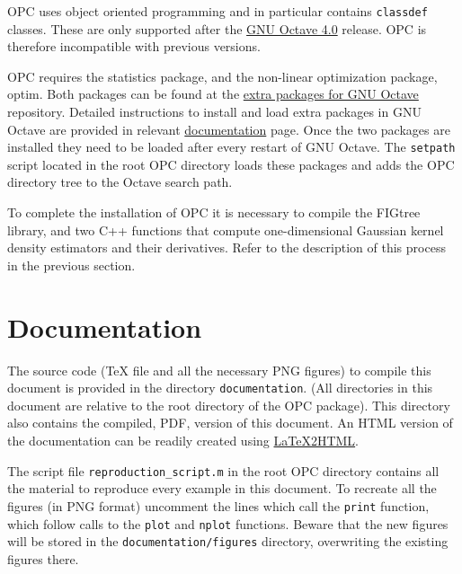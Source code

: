 \documentclass{book}
\begin{document}
OPC uses object oriented programming and in particular contains {\tt classdef}
classes. These are only supported after the
%
\href{https://octave.org/doc/v4.2.2/classdef-Classes.html#classdef-Classes}
{GNU Octave 4.0}
%
release. OPC is therefore incompatible with previous versions.


OPC requires the statistics package, and the non-linear optimization package,
optim. 
%
Both packages can be found at the
\href{https://octave.sourceforge.io/packages.php}{extra packages for GNU
Octave} repository.
%
Detailed instructions to install and load extra packages in GNU Octave are
provided in relevant
\href{https://octave.org/doc/interpreter/Packages.html#Packages}{documentation}
page.
%
Once the two packages are installed they need to be loaded after every restart
of GNU Octave. The {\tt setpath} script located in the root OPC directory loads
these packages and adds the OPC directory tree to the Octave search path.

To complete the installation of OPC it is necessary to compile the FIGtree
library, and two C++ functions that compute one-dimensional Gaussian kernel
density estimators and their derivatives. Refer to the description of this
process in the previous section.



\section{Documentation}


The source code ({\TeX} file and all the necessary PNG figures) to compile this document is
provided in the directory {\tt documentation}. (All directories in this
document are relative to the root directory of the OPC package). This
directory also contains the compiled, PDF, version of this document.
%
An HTML version of the documentation can be readily created using
\href{http://www.latex2html.org/}{LaTeX2HTML}.
%
%



The script file {\tt reproduction\_script.m} in the root OPC directory
contains all the material to reproduce every example in this
document. To recreate all the figures (in PNG format) uncomment the
lines which call the {\tt print} function, which follow 
calls to the 
{\tt plot} and {\tt nplot} functions. Beware that the new figures
will be stored in the {\tt documentation/figures} directory,
overwriting the existing figures there.
\end{document}
